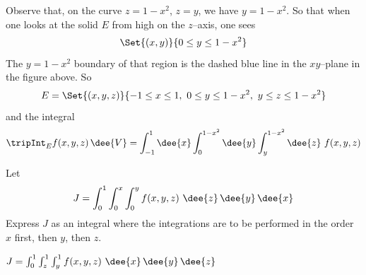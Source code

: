 \begin{solution}
Observe that, on the curve $z=1-x^2$, $z=y$, we have
$y=1-x^2$. So that when one looks at the solid $E$ from high on the $z$--axis,
one sees
\begin{equation*}
\Set{(x,y)}{0\le y\le 1-x^2}
\end{equation*} 
The $y=1-x^2$ boundary of that region is the dashed blue line in the 
$xy$--plane in the figure above. So 
\begin{equation*}
E = \Set{(x,y,z)}{-1\le x\le 1,\ 0\le y\le 1-x^2,\ y\le z\le 1-x^2}
\end{equation*}
and the integral
\begin{equation*}
\tripInt_E f(x,y,z)\,\dee{V}
=\int_{-1}^1\dee{x}\int_0^{1-x^2}\dee{y}\int_y^{1-x^2}\dee{z}\ f(x,y,z)
\end{equation*}
\end{solution}

\begin{question}[M200 2014A] %
Let
\begin{equation*}
J=\int_0^1 \int_0^x\int_0^y f(x,y,z)\ \dee{z}\,\dee{y}\,\dee{x}
\end{equation*}
Express $J$ as an integral where the integrations are to be performed 
in the order $x$ first, then $y$, then $z$.
\end{question}

%

\begin{answer}
$J = \int_0^1 \int_z^1\int_y^1 f(x,y,z)\ \dee{x}\,\dee{y}\,\dee{z}$
\end{answer}

